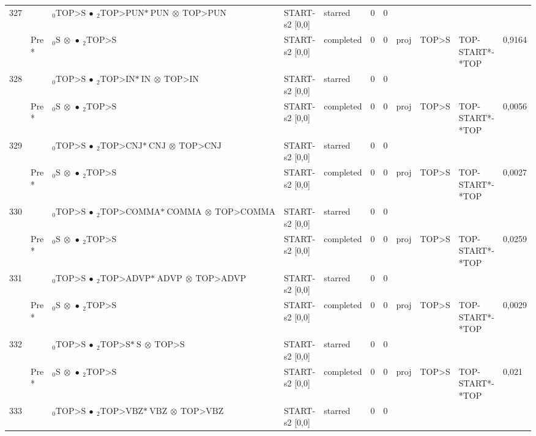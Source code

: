 \documentclass[10pt]{article}
\begin{document}
\begin{longtable}[htbp]{lllllllllll}
327 & & $ {}_0 \textrm{TOP>S} \  \bullet \ {}_{2} \textrm{TOP>PUN*} \ \textrm{PUN} \  \otimes \ \textrm{TOP>PUN} $ & START-s2 [0,0] & starred & 0 & 0 & & & & \\ 
 & Pre *& $ {}_0 \textrm{S} \  \otimes \  \bullet \ {}_{2} \textrm{TOP>S} $ & START-s2 [0,0] & completed & 0 & 0 & proj & TOP>S & TOP-START*-*TOP & 0,9164 \\ 
328 & & $ {}_0 \textrm{TOP>S} \  \bullet \ {}_{2} \textrm{TOP>IN*} \ \textrm{IN} \  \otimes \ \textrm{TOP>IN} $ & START-s2 [0,0] & starred & 0 & 0 & & & & \\ 
 & Pre *& $ {}_0 \textrm{S} \  \otimes \  \bullet \ {}_{2} \textrm{TOP>S} $ & START-s2 [0,0] & completed & 0 & 0 & proj & TOP>S & TOP-START*-*TOP & 0,0056 \\ 
329 & & $ {}_0 \textrm{TOP>S} \  \bullet \ {}_{2} \textrm{TOP>CNJ*} \ \textrm{CNJ} \  \otimes \ \textrm{TOP>CNJ} $ & START-s2 [0,0] & starred & 0 & 0 & & & & \\ 
 & Pre *& $ {}_0 \textrm{S} \  \otimes \  \bullet \ {}_{2} \textrm{TOP>S} $ & START-s2 [0,0] & completed & 0 & 0 & proj & TOP>S & TOP-START*-*TOP & 0,0027 \\ 
330 & & $ {}_0 \textrm{TOP>S} \  \bullet \ {}_{2} \textrm{TOP>COMMA*} \ \textrm{COMMA} \  \otimes \ \textrm{TOP>COMMA} $ & START-s2 [0,0] & starred & 0 & 0 & & & & \\ 
 & Pre *& $ {}_0 \textrm{S} \  \otimes \  \bullet \ {}_{2} \textrm{TOP>S} $ & START-s2 [0,0] & completed & 0 & 0 & proj & TOP>S & TOP-START*-*TOP & 0,0259 \\ 
331 & & $ {}_0 \textrm{TOP>S} \  \bullet \ {}_{2} \textrm{TOP>ADVP*} \ \textrm{ADVP} \  \otimes \ \textrm{TOP>ADVP} $ & START-s2 [0,0] & starred & 0 & 0 & & & & \\ 
 & Pre *& $ {}_0 \textrm{S} \  \otimes \  \bullet \ {}_{2} \textrm{TOP>S} $ & START-s2 [0,0] & completed & 0 & 0 & proj & TOP>S & TOP-START*-*TOP & 0,0029 \\ 
332 & & $ {}_0 \textrm{TOP>S} \  \bullet \ {}_{2} \textrm{TOP>S*} \ \textrm{S} \  \otimes \ \textrm{TOP>S} $ & START-s2 [0,0] & starred & 0 & 0 & & & & \\ 
 & Pre *& $ {}_0 \textrm{S} \  \otimes \  \bullet \ {}_{2} \textrm{TOP>S} $ & START-s2 [0,0] & completed & 0 & 0 & proj & TOP>S & TOP-START*-*TOP & 0,021 \\ 
333 & & $ {}_0 \textrm{TOP>S} \  \bullet \ {}_{2} \textrm{TOP>VBZ*} \ \textrm{VBZ} \  \otimes \ \textrm{TOP>VBZ} $ & START-s2 [0,0] & starred & 0 & 0 & & & & \\ 

\end{longtable}
\end{document}
